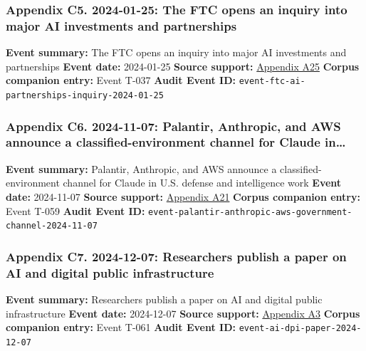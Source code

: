 \documentclass[
  american,
  11pt,
  letterpaper,
]{article}
\begin{document}
\subsubsection{Appendix C5. 2024-01-25: The FTC opens an inquiry into
major AI investments and
partnerships}\label{appendix-c5-2024-01-25-the-ftc-opens-an-inquiry-into-major-ai-investments-and-partnerships}

\textbf{Event summary:} The FTC opens an inquiry into major AI
investments and partnerships \textbf{Event date:} 2024-01-25
\textbf{Source support:}
\hyperref[appendix-a25-ftc-opens-inquiry-into-big-tech-s-partnerships-with-leading-ai-startups]{Appendix
A25} \textbf{Corpus companion entry:} Event T-037 \textbf{Audit Event
ID:} \texttt{event-ftc-ai-partnerships-inquiry-2024-01-25}

\subsubsection{Appendix C6. 2024-11-07: Palantir, Anthropic, and AWS
announce a classified-environment channel for Claude
in\ldots{}}\label{appendix-c6-2024-11-07-palantir-anthropic-and-aws-announce-a-classified-environment-channel-for-claude-in-u-s-defense-and-intelligence-work}

\textbf{Event summary:} Palantir, Anthropic, and AWS announce a
classified-environment channel for Claude in U.S. defense and
intelligence work \textbf{Event date:} 2024-11-07 \textbf{Source
support:}
\hyperref[appendix-a21-anthropic-and-palantir-partner-to-bring-claude-ai-models-to-aws-for-u-s-government-intelligence-and-defense-operations]{Appendix
A21} \textbf{Corpus companion entry:} Event T-059 \textbf{Audit Event
ID:} \texttt{event-palantir-anthropic-aws-government-channel-2024-11-07}

\subsubsection{Appendix C7. 2024-12-07: Researchers publish a paper on
AI and digital public
infrastructure}\label{appendix-c7-2024-12-07-researchers-publish-a-paper-on-ai-and-digital-public-infrastructure}

\textbf{Event summary:} Researchers publish a paper on AI and digital
public infrastructure \textbf{Event date:} 2024-12-07 \textbf{Source
support:}
\hyperref[appendix-a3-interactions-between-artificial-intelligence-and-digital-public-infrastructure-concepts-benefits-and-challenges]{Appendix
A3} \textbf{Corpus companion entry:} Event T-061 \textbf{Audit Event
ID:} \texttt{event-ai-dpi-paper-2024-12-07}
\end{document}
